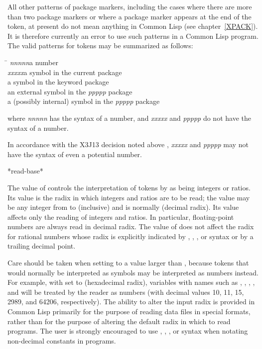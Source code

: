 All other patterns of package markers,
including the cases where there are more than two
package markers or where a package marker appears at the end of the token,
at present do not mean anything in Common Lisp (see chapter~\ref{XPACK}).
It is therefore currently an error to use such patterns in a Common Lisp program.
The valid patterns for tokens may be summarized as follows:
\begin{tabbing}
\hskip 8pc\=\kill
\emph{nnnnn}\>a number \\
\emph{xxxxx}\>a symbol in the current package \\
\>a symbol in the keyword package \\
\>an external symbol in the \emph{ppppp} package \\
\>a (possibly internal) symbol in the \emph{ppppp} package
\end{tabbing}
where \emph{nnnnn} has the syntax of a number, and \emph{xxxxx} and \emph{ppppp} do
not have the syntax of a number.

\begin{new}
In accordance with the X3J13 decision noted above
, \emph{xxxxx} and \emph{ppppp} may not have the syntax of even
a potential number.
\end{new}

\begin{defun}[Variable]
*read-base*

The value of  controls the interpretation of tokens
by  as being integers or ratios.  Its value is the radix
in which integers and ratios are to be read; the value may be any integer
from  to  (inclusive) and is normally  (decimal radix).
Its value affects only the reading of integers and ratios.
In particular, floating-point numbers are always read in decimal radix.
The value of  does not affect the radix for rational numbers
whose radix is explicitly indicated by
, , , or  syntax
or by a trailing decimal point.

Care should be taken when setting  to a value larger
than , because tokens that would normally be interpreted as
symbols may be interpreted as numbers instead.  For example,
with  set to  (hexadecimal radix), variables
with names such as , , , , and 
will be treated by the reader as numbers (with decimal values
10, 11, 15, 2989, and 64206, respectively).  The ability to alter
the input radix is provided in Common Lisp primarily for the purpose of
reading data files in special formats, rather than for the purpose of altering
the default radix in which to read programs.  The user is strongly
encouraged to use , , , or  syntax when
notating non-decimal constants in programs.
\end{defun}

